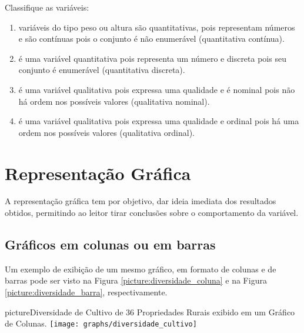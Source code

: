 \documentclass[11pt,fleqn]{book}
\numberwithin{mpicture}{chapter}
\numberwithin{mtable}{chapter}
\numberwithin{mframe}{chapter}
\begin{document}
\begin{example}
	\label{example:estatistica_descritiva}
	
	Classifique as variáveis:
	\begin{enumerate}[label=\alph*)]
		\item {} variáveis do tipo peso ou altura são quantitativas, pois representam números e são contínuas pois o conjunto é não enumerável (quantitativa contínua).
		
		\item {} é uma variável quantitativa pois representa um número e discreta pois seu conjunto é enumerável (quantitativa discreta).
		
		\item {} é uma variável qualitativa pois expressa uma qualidade e é nominal pois não há ordem nos possíveis valores (qualitativa nominal).
		
		\item {} é uma variável qualitativa pois expressa uma qualidade e ordinal pois há uma ordem nos possíveis valores (qualitativa ordinal).
	\end{enumerate}
\end{example}

\section{Representação Gráfica}

A representação gráfica tem por objetivo, dar ideia imediata dos resultados obtidos, permitindo ao leitor tirar conclusões sobre o comportamento da variável.

\subsection{Gráficos em colunas ou em barras}

Um exemplo de exibição de um mesmo gráfico, em formato de colunas e de barras pode ser visto na Figura \ref{picture:diversidade_coluna} e na Figura \ref{picture:diversidade_barra}, respectivamente.

\vspace{10pt}

\begin{pageWidthArea}
	\begin{pageWidthAreaPicture}{picture}{Diversidade de Cultivo de 36 Propriedades Rurais exibido em um Gráfico de Colunas.}
		\label{picture:diversidade_coluna}
		\centering
		\texttt{[image: graphs/diversidade\_cultivo]}
	\end{pageWidthAreaPicture}
\end{pageWidthArea}
\end{document}
